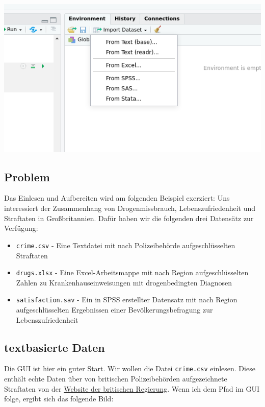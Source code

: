 \documentclass[
]{book}
\begin{document}
\begin{center}\includegraphics[width=0.8\linewidth]{imgs/menu2} \end{center}

\hypertarget{problem}{%
\subsection{Problem}\label{problem}}

Das Einlesen und Aufbereiten wird am folgenden Beispiel exerziert:
Uns interessiert der Zusammenhang von Drogenmissbrauch, Lebenszufriedenheit und Straftaten in Großbritannien. Dafür haben wir die folgenden drei Datensätz zur Verfügung:

\begin{itemize}
\item
  \texttt{\textquotesingle{}crime.csv\textquotesingle{}} - Eine Textdatei mit nach Polizeibehörde aufgeschlüsselten Straftaten
\item
  \texttt{\textquotesingle{}drugs.xlsx\textquotesingle{}} - Eine Excel-Arbeitsmappe mit nach Region aufgeschlüsselten Zahlen zu Krankenhauseinweisungen mit drogenbedingten Diagnosen
\item
  \texttt{\textquotesingle{}satisfaction.sav\textquotesingle{}} - Ein in SPSS erstellter Datensatz mit nach Region aufgeschlüsselten Ergebnissen einer Bevölkerungsbefragung zur Lebenszufriedenheit
\end{itemize}

\hypertarget{textbasierte-daten}{%
\subsection{textbasierte Daten}\label{textbasierte-daten}}

Die GUI ist hier ein guter Start. Wir wollen die Datei \texttt{\textquotesingle{}crime.csv\textquotesingle{}} einlesen. Diese enthält echte Daten über von britischen Polizeibehörden aufgezeichnete Straftaten von der \href{https://www.gov.uk/government/statistics/historical-crime-data}{Website der britischen Regierung}. Wenn ich dem Pfad im GUI folge, ergibt sich das folgende Bild:
\end{document}

